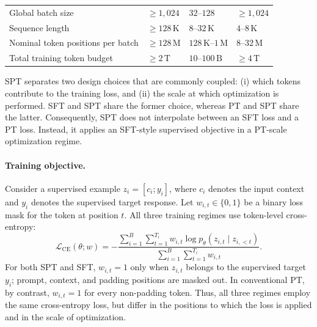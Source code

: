 \begin{table}[H]
\begin{tabularx}{
    \textwidth
}{
    @{}
    >{\raggedright\arraybackslash}p{}
    >{\centering\arraybackslash}X
    >{\centering\arraybackslash}X
    >{\centering\arraybackslash}X
    @{}
}
Global batch size
&
$\geq 1{,}024$
&
$32$--$128$
&
$\geq 1{,}024$
\\

Sequence length
&
$\geq 128\,\mathrm{K}$
&
$8$--$32\,\mathrm{K}$
&
$4$--$8\,\mathrm{K}$
\\

Nominal token positions per batch
&
$\geq 128\,\mathrm{M}$
&
$128\,\mathrm{K}$--$1\,\mathrm{M}$
&
$8$--$32\,\mathrm{M}$
\\

Total training token budget
&
$\geq 2\,\mathrm{T}$
&
$10$--$100\,\mathrm{B}$
&
$\geq 4\,\mathrm{T}$
\\

\bottomrule
\end{tabularx}

\vspace{2pt}
\end{table}


SPT separates two design choices that are commonly coupled:
(i) which tokens contribute to the training loss, and
(ii) the scale at which optimization is performed.
SFT and SPT share the former choice, whereas PT and SPT share the
latter. Consequently, SPT does not interpolate between an SFT loss and
a PT loss. Instead, it applies an SFT-style supervised objective in a
PT-scale optimization regime.

\paragraph{Training objective.}
Consider a supervised example
$z_i = [c_i; y_i]$, where $c_i$ denotes the input context and $y_i$
denotes the supervised target response. Let $w_{i,t} \in \{0,1\}$ be a
binary loss mask for the token at position $t$. All three training
regimes use token-level cross-entropy:
%
\begin{equation*}
\mathcal{L}_{\mathrm{CE}}(\theta; w)
=
-
\frac{
    \displaystyle
    \sum_{i=1}^{B}
    \sum_{t=1}^{T_i}
    w_{i,t}
    \log p_{\theta}
    \left(
        z_{i,t} \mid z_{i,<t}
    \right)
}{
    \displaystyle
    \sum_{i=1}^{B}
    \sum_{t=1}^{T_i}
    w_{i,t}
}.
\label{eq:spt-loss}
\end{equation*}
%
For both SPT and SFT, $w_{i,t}=1$ only when $z_{i,t}$ belongs to the
supervised target $y_i$; prompt, context, and padding positions are
masked out. In conventional PT, by contrast, $w_{i,t}=1$ for every non-padding token. Thus, all three regimes employ the same cross-entropy loss, but differ in the positions to which the loss is applied and in the scale of optimization.

